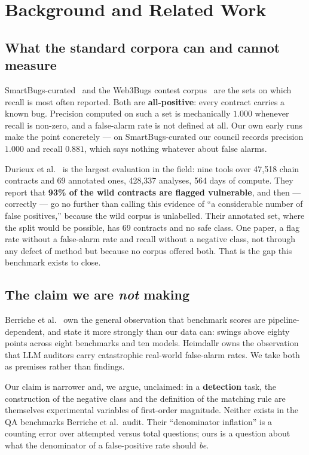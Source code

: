 \documentclass[sigconf,nonacm]{acmart}
\begin{document}
\section{Background and Related Work}

\subsection{What the standard corpora can and cannot measure}

SmartBugs-curated~\cite{smartbugs} and the Web3Bugs contest
corpus~\cite{web3bugs} are the sets on which recall is most often reported. Both
are \textbf{all-positive}: every contract carries a known bug. Precision computed
on such a set is mechanically $1.000$ whenever recall is non-zero, and a
false-alarm rate is not defined at all. Our own early runs make the point
concretely --- on SmartBugs-curated our council records precision $1.000$ and
recall $0.881$, which says nothing whatever about false alarms.

Durieux et al.~\cite{durieux} is the largest evaluation in the field: nine tools
over 47,518 chain contracts and 69 annotated ones, 428,337 analyses, 564 days of
compute. They report that \textbf{93\% of the wild contracts are flagged
vulnerable}, and then --- correctly --- go no further than calling this evidence
of ``a considerable number of false positives,'' because the wild corpus is
unlabelled. Their annotated set, where the split would be possible, has 69
contracts and no safe class. One paper, a flag rate without a false-alarm rate
and recall without a negative class, not through any defect of method but because
no corpus offered both. That is the gap this benchmark exists to close.

\subsection{The claim we are \emph{not} making}

Berriche et al.~\cite{berriche} own the general observation that benchmark scores
are pipeline-dependent, and state it more strongly than our data can: swings
above eighty points across eight benchmarks and ten models. Heimdallr
\cite{heimdallr} owns the observation that LLM auditors carry catastrophic
real-world false-alarm rates. We take both as premises rather than findings.

Our claim is narrower and, we argue, unclaimed: in a \textbf{detection} task, the
construction of the negative class and the definition of the matching rule are
themselves experimental variables of first-order magnitude. Neither exists in the
QA benchmarks Berriche et al.\ audit. Their ``denominator inflation'' is a
counting error over attempted versus total questions; ours is a question about
what the denominator of a false-positive rate should \emph{be}.
\end{document}
